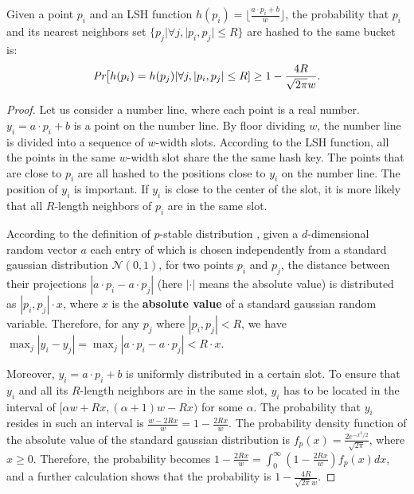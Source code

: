 \begin{lemma}
%
\label{lm:prob1}
%
Given a point $p_i$ and an LSH function $h(p_i)=\lfloor \frac{a\cdot
p_i+b}{w}\rfloor$, the probability that $p_i$ and its nearest neighbors set $\{p_j|\forall j, |p_i,p_j|\leq R\}$ are hashed to the same bucket is:
%
\begin{equation}\label{eq:lm:prob1}
%
\begin{aligned}
%
  \emph{Pr}\big[h(p_i)=h(p_{j})|\forall j, |p_i,p_j|\leq R] \geq 1-\frac{4R}{\sqrt{2\pi}w}.
%
\end{aligned}
\end{equation}
\end{lemma}
\begin{proof}

Let us consider a number line, where each point is a real number.
$y_i=a\cdot p_i+b$ is a point on the number line. By floor dividing
$w$, the number line is divided into a sequence of $w$-width slots.
According to the LSH function, all the points in the same $w$-width
slot share the the same hash key.  The points that are close to $p_i$
are all hashed to the positions close to $y_i$ on the number line.  The
position of $y_i$ is important.  If $y_i$ is close to the center of
the slot, it is more likely that all $R$-length neighbors of $p_i$
are in the same slot.

According to the definition of $p$-stable distribution
\cite{datar}, given a $d$-dimensional random
vector $a$ each entry of which is chosen independently from a standard
gaussian distribution $\mathcal{N}(0,1)$, for two points $p_i$ and
$p_j$, the distance between their projections $|a\cdot p_i-a\cdot
p_j|$ (here $|\cdot|$ means the absolute value) is distributed as $|p_i, p_j|\cdot x$, where $x$ is the \textbf{absolute
value} of a standard gaussian random variable. Therefore, for any
$p_j$ where $|p_i, p_j|<R$, we have $\max_{j}|y_i-y_j|=\max_{j}|a\cdot
p_i-a\cdot p_j|<R\cdot x$.
%

Moreover, $y_i=a\cdot p_i+b$ is uniformly distributed in a certain
slot. To ensure that $y_i$ and all its $R$-length neighbors are in
the same slot, $y_i$ has to be located in the interval of $[\alpha
w+Rx,(\alpha+1)w-Rx)$ for some $\alpha$.   The probability that $y_i$ resides in such an
interval is $\frac{w-2Rx}{w}=1-\frac{2Rx}{w}$.
%
The probability density function of the absolute value of the standard
gaussian distribution is $f_p(x)=\frac{2e^{-x^2/2}}{\sqrt{2\pi}}$,
where $x \geq 0$.  Therefore, the probability becomes
$1-\frac{2Rx}{w}=\int_{0}^{\infty}(1-\frac{2Rx}{w})f_p(x)dx$, and
a further calculation shows that the probability is
$1-\frac{4R}{\sqrt{2\pi}w}$.
\end{proof}

